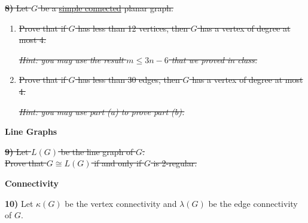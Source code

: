 \documentclass[12pt]{article}
\begin{document}
\sout{\textbf{8)} Let $G$ be a \underline{simple connected} planar graph.}

\begin{enumerate}
\item[a)] \sout{Prove that if $G$ has less than 12 vertices, then $G$ has a vertex of degree at most 4.}

\sout{\textit{Hint: you may use the result $m \leq 3n - 6$ that we proved in class.}}

\item[b)] \sout{Prove that if $G$ has less than 30 edges, then $G$ has a vertex of degree at most 4.}

\sout{\textit{Hint: you may use part (a) to prove part (b).}}
\end{enumerate}

\begin{center}
{\large\bfseries\color{red} Line Graphs}
\end{center}

\sout{\textbf{9)} Let $L(G)$ be the line graph of $G$.}\\
\hspace*{1.5em}\sout{Prove that $G \cong L(G)$ if and only if $G$ is 2-regular.}

\begin{center}
{\large\bfseries\color{red} Connectivity}
\end{center}

\textbf{10)} Let $\kappa(G)$ be the vertex connectivity and $\lambda(G)$ be the edge connectivity of $G$.
\end{document}
